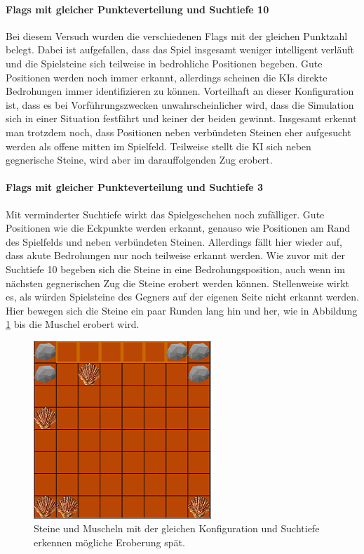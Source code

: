 \paragraph{Flags mit gleicher Punkteverteilung und Suchtiefe 10}
Bei diesem Versuch wurden die verschiedenen Flags mit der gleichen Punktzahl belegt. Dabei ist aufgefallen, dass das Spiel insgesamt weniger intelligent verläuft und die Spielsteine sich teilweise in bedrohliche Positionen begeben. Gute Positionen werden noch immer erkannt, allerdings scheinen die KIs direkte Bedrohungen immer identifizieren zu können. Vorteilhaft an dieser Konfiguration ist, dass es bei Vorführungszwecken unwahrscheinlicher wird, dass die Simulation sich in einer Situation festfährt und keiner der beiden gewinnt. Insgesamt erkennt man trotzdem noch, dass Positionen neben verbündeten Steinen eher aufgesucht werden als offene mitten im Spielfeld. Teilweise stellt die KI sich neben gegnerische Steine, wird aber im darauffolgenden Zug erobert. 

\paragraph{Flags mit gleicher Punkteverteilung und Suchtiefe 3}
Mit verminderter Suchtiefe wirkt das Spielgeschehen noch zufälliger. Gute Positionen wie die Eckpunkte werden erkannt, genauso wie Positionen am Rand des Spielfelds und neben verbündeten Steinen. Allerdings fällt hier wieder auf, dass akute Bedrohungen nur noch teilweise erkannt werden. Wie zuvor mit der Suchtiefe 10 begeben sich die Steine in eine Bedrohungsposition, auch wenn im nächsten gegnerischen Zug die Steine erobert werden können. Stellenweise wirkt es, als würden Spielsteine des Gegners auf der eigenen Seite nicht erkannt werden. Hier bewegen sich die Steine ein paar Runden lang hin und her, wie in Abbildung \ref{fig:hinundherboth} bis die Muschel erobert wird.
\begin{figure}[h]
	\centering
	\includegraphics{img/both/muschelnichterkannt}

	\caption{Steine und Muscheln mit der gleichen Konfiguration und Suchtiefe erkennen mögliche Eroberung spät.}
	\label{fig:hinundherboth}
\end{figure}


